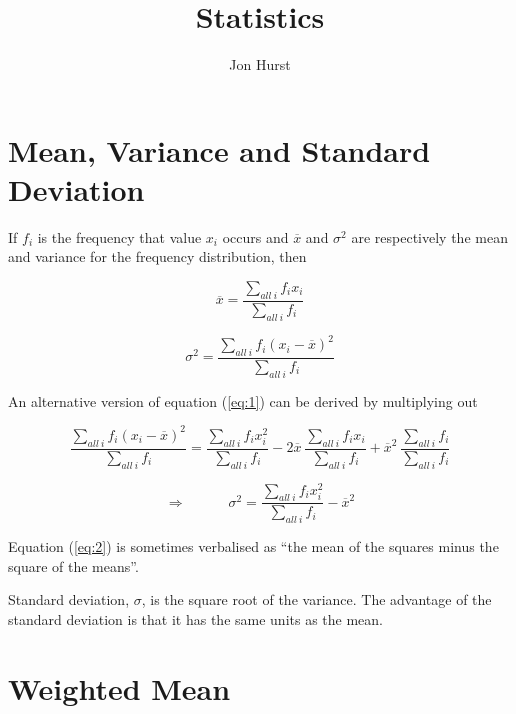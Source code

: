 \documentclass[a5paper]{article}
\title{Statistics}
\author{Jon Hurst}
\begin{document}
\maketitle

\section{Mean, Variance and Standard Deviation}

If $f_i$ is the frequency that value $x_i$ occurs and $\overline{x}$ and
$\sigma^2$ are respectively the mean and variance for the frequency
distribution, then

\begin{equation}
  \overline{x} = \frac{\sum\limits_{all\ i} f_i x_i}{\sum\limits_{all\ i} f_i}
\end{equation}

\begin{equation} \label{eq:1}
  \sigma^2 = \frac{\sum\limits_{all\ i} f_i (x_i - \overline{x})^2}{\sum\limits_{all\ i} f_i}
\end{equation}

\noindent An alternative version of equation (\ref{eq:1}) can be derived by
multiplying out

\begin{equation}
  \frac{\sum\limits_{all\ i} f_i (x_i - \overline{x})^2}{\sum\limits_{all\ i} f_i} =
  \frac{\sum\limits_{all\ i} f_i x_i^2}{\sum\limits_{all\ i} f_i}
  -2\overline{x}\ \frac{\sum\limits_{all\ i} f_i x_i}{\sum\limits_{all\ i} f_i}
  + \overline{x}^2\ \frac{\sum\limits_{all\ i} f_i}{\sum\limits_{all\ i} f_i}
\end{equation}

\begin{equation} \label{eq:2}
  \Rightarrow\hspace{3em} \sigma^2 = \frac{\sum\limits_{all\ i} f_i x_i^2}{\sum\limits_{all\ i} f_i} -
  \overline{x}^2
\end{equation}

\noindent Equation (\ref{eq:2}) is sometimes verbalised as ``the mean of the squares
minus the square of the means''.

Standard deviation, $\sigma$, is the square root of the variance. The advantage
of the standard deviation is that it has the same units as the mean.

\section{Weighted Mean}
\end{document}
